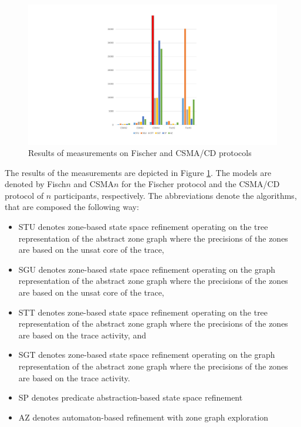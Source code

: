 \begin{figure}
	\centering
	\includegraphics[width=\textwidth]{include/figures/diag_fischcsma}
	\caption{Results of measurements on Fischer and CSMA/CD protocols}
	\label{fig:mesurements}
\end{figure}

The results of the measurements are depicted in Figure \ref{fig:mesurements}. The models are denoted by Fisch$n$ and CSMA$n$ for the Fischer protocol and the CSMA/CD protocol of $n$ participants, respectively. The abbreviations denote the algorithms, that are composed the following way:

\begin{itemize}
	\item STU denotes zone-based state space refinement operating on the tree representation of the abstract zone graph where the precisions of the zones are based on the unsat core of the trace,
	\item SGU denotes zone-based state space refinement operating on the graph representation of the abstract zone graph where the precisions of the zones are based on the unsat core of the trace,
	\item STT denotes zone-based state space refinement operating on the tree representation of the abstract zone graph where the precisions of the zones are based on the trace activity, and
	\item SGT denotes zone-based state space refinement operating on the graph representation of the abstract zone graph where the precisions of the zones are based on the trace activity.
	\item SP denotes predicate abstraction-based state space refinement
	\item AZ denotes automaton-based refinement with zone graph exploration
\end{itemize}

